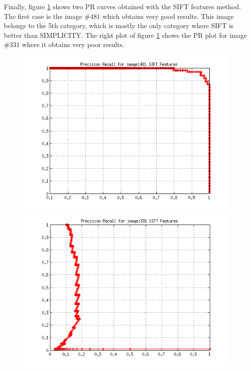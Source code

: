 \documentclass[a4paper,12pt]{article}
\begin{document}
Finally, figure \ref{fig:sgb} shows two PR curves obtained with the SIFT features method.
The first case is the image $\#481$ which obtains very good results. This image belongs
to the 5th category, which is mostly the only category where SIFT is better than SIMPLICITY.
The right plot of figure \ref{fig:sgb} shows the PR plot for image $\#331$ where it obtains very poor results.
\begin{figure}[h!]
    \centering
    \includegraphics[totalheight=.24\textheight]{../Results/PR/GoodSIFT.png}
    \includegraphics[totalheight=.24\textheight]{../Results/PR/BadSIFT.png}
    \label{fig:sgb}
\end{figure}


\end{document}
